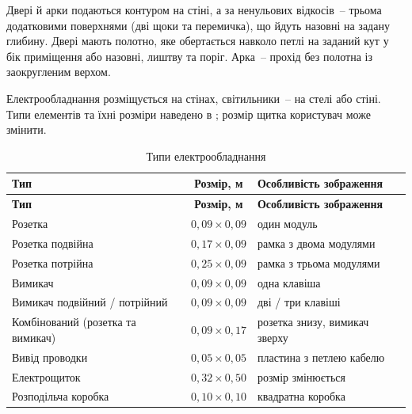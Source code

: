 Двері й арки подаються контуром на стіні, а за ненульових відкосів~-- трьома додатковими поверхнями (дві щоки та перемичка), що йдуть назовні на задану глибину. Двері мають полотно, яке обертається навколо петлі на заданий кут у бік приміщення або назовні, лиштву та поріг. Арка~-- прохід без полотна із заокругленим верхом.



Електрообладнання розміщується на стінах, світильники~-- на стелі або стіні. Типи елементів та їхні розміри наведено в ; розмір щитка користувач може змінити.

\begin{spacing}{1.15}
\small\noindent
\begin{xltabular}{\textwidth}{| >{\raggedright\arraybackslash}p{5.2cm} | c | >{\raggedright\arraybackslash}X |}
    \caption{Типи електрообладнання} \label{tab:elements} \\
    \hline
    \textbf{Тип} & \textbf{Розмір, м} & \textbf{Особливість зображення} \\ \hline
    \endfirsthead

    \hline
    \textbf{Тип} & \textbf{Розмір, м} & \textbf{Особливість зображення} \\ \hline
    \endhead

    Розетка & $0{,}09\times0{,}09$ & один модуль \\ \hline
    Розетка подвійна & $0{,}17\times0{,}09$ & рамка з двома модулями \\ \hline
    Розетка потрійна & $0{,}25\times0{,}09$ & рамка з трьома модулями \\ \hline
    Вимикач & $0{,}09\times0{,}09$ & одна клавіша \\ \hline
    Вимикач подвійний / потрійний & $0{,}09\times0{,}09$ & дві / три клавіші \\ \hline
    Комбінований (розетка та вимикач) & $0{,}09\times0{,}17$ & розетка знизу, вимикач зверху \\ \hline
    Вивід проводки & $0{,}05\times0{,}05$ & пластина з петлею кабелю \\ \hline
    Електрощиток & $0{,}32\times0{,}50$ & розмір змінюється \\ \hline
    Розподільча коробка & $0{,}10\times0{,}10$ & квадратна коробка \\ \hline
\end{xltabular}
\end{spacing}

